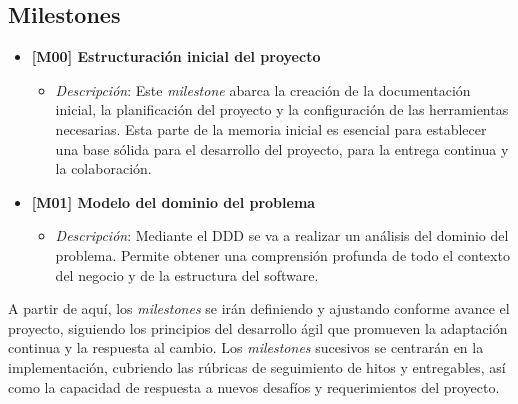 \subsection{Milestones}

\begin{itemize}
    \item \textbf{[M00] \- Estructuración inicial del proyecto}
    \begin{itemize}
        \item \textit{Descripción}: Este \textit{milestone} abarca la creación de la documentación inicial, la planificación del proyecto y la configuración de las herramientas necesarias. Esta parte de la memoria inicial es esencial para establecer una base sólida para el desarrollo del proyecto, para la entrega continua y la colaboración.
    \end{itemize}

    \item \textbf{[M01] \- Modelo del dominio del problema}
    \begin{itemize}
        \item \textit{Descripción}: Mediante el DDD se va a realizar un análisis del dominio del problema. Permite obtener una comprensión profunda de todo el contexto del negocio y de la estructura del software.
    \end{itemize}
\end{itemize}

A partir de aquí, los \textit{milestones} se irán definiendo y ajustando conforme avance el proyecto, siguiendo los principios del desarrollo ágil que promueven la adaptación continua y la respuesta al cambio. Los \textit{milestones} sucesivos se centrarán en la implementación, cubriendo las rúbricas de seguimiento de hitos y entregables, así como la capacidad de respuesta a nuevos desafíos y requerimientos del proyecto.